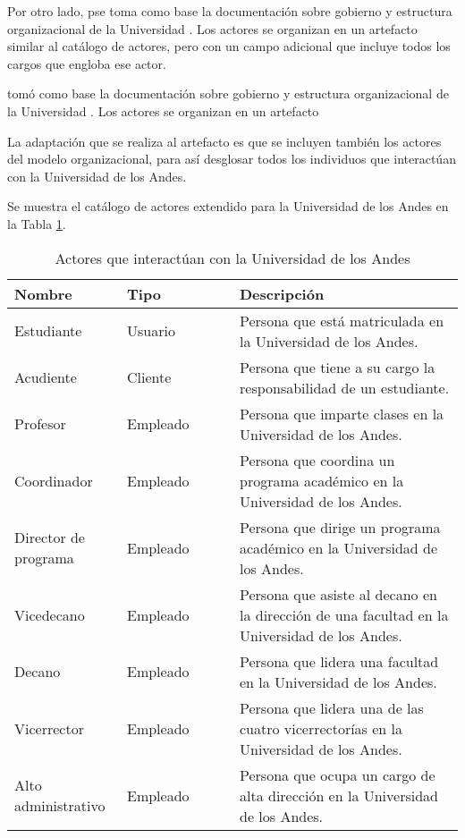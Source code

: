 Por otro lado, pse toma como base la documentación sobre gobierno y estructura organizacional de la Universidad \cite{gobieronEstructuraOrganizacional}. Los actores se organizan en un artefacto similar al catálogo de actores, pero con un campo adicional que incluye todos los cargos que engloba ese actor.


tomó como base la documentación sobre gobierno y estructura organizacional de la Universidad \cite{gobiernoEstructuraOrganizacional}. Los actores se organizan en un artefacto


 La adaptación que se realiza al artefacto es que se incluyen también los actores del modelo organizacional, para así desglosar todos los individuos que interactúan con la Universidad de los Andes.

Se muestra el catálogo de actores extendido para la Universidad de los Andes en la Tabla \ref{tab:actores}.

\begin{table}[h]
  \caption{Actores que interactúan con la Universidad de los Andes}
  \centering
  \alternatecolors
  \begin{tabular}{|p{0.25\linewidth}|p{0.25\linewidth}|p{0.5\linewidth}|}
  \hline
  \textbf{Nombre} & \textbf{Tipo} & \textbf{Descripción} \\
  \hline
  Estudiante & Usuario & Persona que está matriculada en la Universidad de los Andes. \\
  Acudiente & Cliente & Persona que tiene a su cargo la responsabilidad de un estudiante. \\ \hline
  Profesor & Empleado & Persona que imparte clases en la Universidad de los Andes. \\ \hline
  Coordinador & Empleado & Persona que coordina un programa académico en la Universidad de los Andes. \\ \hline
  Director de programa & Empleado & Persona que dirige un programa académico en la Universidad de los Andes. \\
  Vicedecano & Empleado & Persona que asiste al decano en la dirección de una facultad en la Universidad de los Andes. \\
  Decano & Empleado & Persona que lidera una facultad en la Universidad de los Andes. \\
  Vicerrector & Empleado & Persona que lidera una de las cuatro vicerrectorías en la Universidad de los Andes. \\
  Alto administrativo & Empleado & Persona que ocupa un cargo de alta dirección en la Universidad de los Andes. \\
  \hline
  \end{tabular}
  \label{tab:actores}
\end{table}


